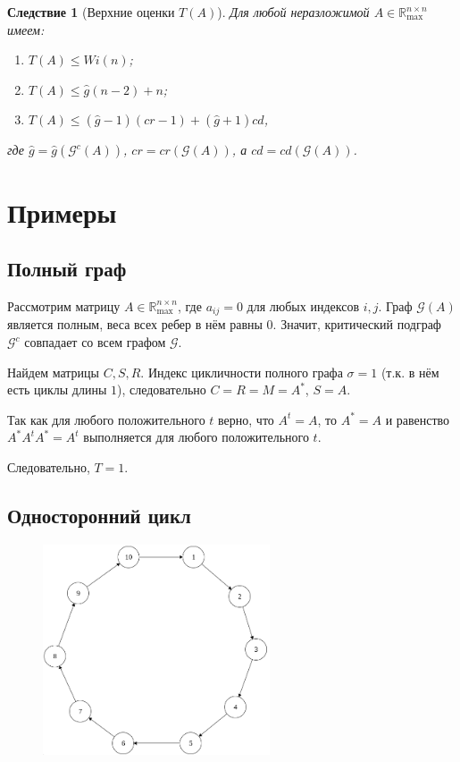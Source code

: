 \documentclass[12pt]{article}
\newtheorem{corollary}[theorem]{Следствие}
\begin{document}
\begin{corollary}[Верхние оценки $T(A)$]
\label{upperBounds}
Для любой неразложимой $A \in \mathbb{R}_{\max}^{n \times n}$ имеем:
\begin{enumerate} 
    \item $T(A) \le Wi(n)$;
    \item $T(A) \le \hat{g}(n - 2) + n$;
    \item $T(A) \le (\hat{g} - 1)(cr - 1) + (\hat{g} + 1) cd$,
\end{enumerate}
где $\hat{g} = \hat{g}(\mathcal{G}^c(A))$, $cr = cr(\mathcal{G}(A))$, а $cd = cd(\mathcal{G}(A))$.
\end{corollary}



\section{Примеры}
\subsection{Полный граф}
Рассмотрим матрицу $A \in \mathbb{R}_{\max}^{n \times n}$, где $a_{ij} = 0$ для любых индексов $i, j$. Граф $\mathcal{G}(A)$ является полным, веса всех ребер в нём равны $0$. Значит, критический подграф $\mathcal{G}^c$ совпадает со всем графом $\mathcal{G}$.

Найдем матрицы $C, S, R$. Индекс цикличности полного графа $\sigma = 1 $ (т.к. в нём есть циклы длины $1$), следовательно $C = R = M = A^*$, $S = A$.

Так как для любого положительного $t$ верно, что $A^t = A$, то $A^* = A$ и равенство $A^*A^tA^* = A^t$ выполняется для любого положительного $t$.

Следовательно, $T = 1$.

\subsection{Односторонний цикл}
\begin{figure}[h]
  \centering
    \includegraphics[width=0.6\textwidth]{ForwardCycle}
\end{figure}
\end{document}
